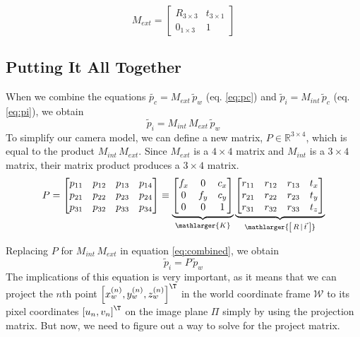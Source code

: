 \begin{equation}
    M_{ext} = 
    \begin{bmatrix}
        R_{3 \times 3} & t_{3 \times 1} \\
        0_{1 \times 3} & 1
    \end{bmatrix} 
\end{equation}

\subsection{Putting It All Together}

When we combine the equations $\widetilde{p_c} = M_{ext}\,\widetilde{p}_w$ (eq. \ref{eq:pc}) and $\widetilde{p}_i = M_{int}\,\widetilde{p}_c$ (eq. \ref{eq:pi}), we obtain
\begin{equation} \label{eq:combined}
    \widetilde{p}_{i} = M_{int}\,M_{ext}\,\widetilde{p}_{w}
\end{equation}
To simplify our camera model, we can define a new matrix, $P \in \mathbb{R}^{3 \times 4}$, which is equal to the product $M_{int}\,M_{ext}$. Since $M_{ext}$ is a $4 \times 4$ matrix and $M_{int}$ is a $3 \times 4$ matrix, their matrix product produces a $3 \times 4$ matrix.
\begin{equation}  
    P=
    \begin{bmatrix}
        p_{11} & p_{12} & p_{13} & p_{14} \\
        p_{21} & p_{22} & p_{23} & p_{24} \\
        p_{31} & p_{32} & p_{33} & p_{34}
    \end{bmatrix}
    \equiv
    \underbrace{
        \begin{bmatrix}
            f_x & 0   & c_x  \\
            0   & f_y & c_y  \\
            0   & 0   & 1   
        \end{bmatrix}
    }_{\mathlarger{K}}
    \underbrace{
        \begin{bmatrix}
            r_{11} & r_{12} & r_{13} & t_x \\
            r_{21} & r_{22} & r_{23} & t_y \\
            r_{31} & r_{32} & r_{33} & t_z \\
        \end{bmatrix}
    }_{\mathlarger{\left[\,R\,\vert\,\vec{t}\:\right]}}
\end{equation}

Replacing $P$ for $M_{int}\,M_{ext}$ in equation \ref{eq:combined}, we obtain
\begin{equation} \label{eq:project}
    \widetilde{p}_{i} = P\,\widetilde{p}_{w}
\end{equation}
The implications of this equation is very important, as it means that we can project the $n$th point $\left[ x_w^{(n)}, y_w^{(n)}, z_w^{(n)} \right]^\T$ in the world coordinate frame $\mathcal{W}$ to its pixel coordinates $\left[ u_n, v_n \right]^\T$ on the image plane $\Pi$ simply by using the projection matrix. But now, we need to figure out a way to solve for the project matrix. 

